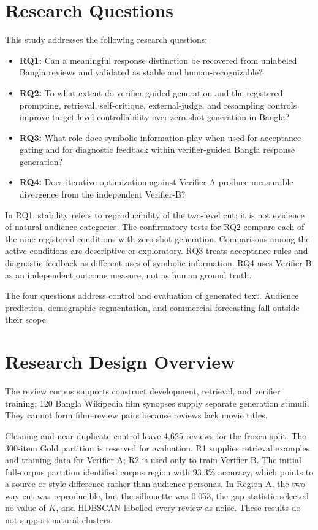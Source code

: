 \section{Research Questions}

This study addresses the following research questions:

\begin{itemize}
\item \textbf{RQ1:} Can a meaningful response distinction be recovered from unlabeled Bangla reviews and validated as stable and human-recognizable?
\item \textbf{RQ2:} To what extent do verifier-guided generation and the registered prompting, retrieval, self-critique, external-judge, and resampling controls improve target-level controllability over zero-shot generation in Bangla?
\item \textbf{RQ3:} What role does symbolic information play when used for acceptance gating and for diagnostic feedback within verifier-guided Bangla response generation?
\item \textbf{RQ4:} Does iterative optimization against Verifier-A produce measurable divergence from the independent Verifier-B?
\end{itemize}

In RQ1, stability refers to reproducibility of the two-level cut; it is not evidence of natural audience categories. The confirmatory tests for RQ2 compare each of the nine registered conditions with zero-shot generation. Comparisons among the active conditions are descriptive or exploratory. RQ3 treats acceptance rules and diagnostic feedback as different uses of symbolic information. RQ4 uses Verifier-B as an independent outcome measure, not as human ground truth.

The four questions address control and evaluation of generated text. Audience prediction, demographic segmentation, and commercial forecasting fall outside their scope.

\section{Research Design Overview}

The review corpus supports construct development, retrieval, and verifier training; 120 Bangla Wikipedia film synopses supply separate generation stimuli. They cannot form film–review pairs because reviews lack movie titles.

Cleaning and near-duplicate control leave 4,625 reviews for the frozen split. The 300-item Gold partition is reserved for evaluation. R1 supplies retrieval examples and training data for Verifier-A; R2 is used only to train Verifier-B. The initial full-corpus partition identified corpus region with 93.3\% accuracy, which points to a source or style difference rather than audience personas. In Region A, the two-way cut was reproducible, but the silhouette was 0.053, the gap statistic selected no value of \(K\), and HDBSCAN labelled every review as noise. These results do not support natural clusters.

